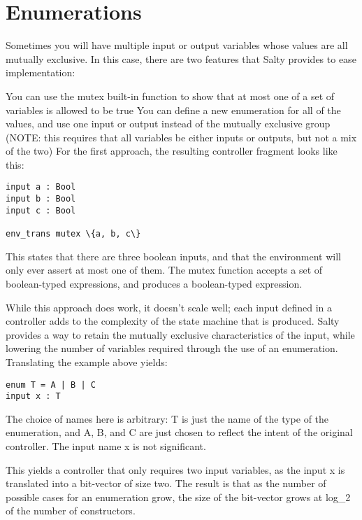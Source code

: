 \section{Enumerations}

Sometimes you will have multiple input or output variables whose values are all mutually exclusive. In this case, there are two features that Salty provides to ease implementation:

You can use the mutex built-in function to show that at most one of a set of variables is allowed to be true
You can define a new enumeration for all of the values, and use one input or output instead of the mutually exclusive group (NOTE: this requires that all variables be either inputs or outputs, but not a mix of the two)
For the first approach, the resulting controller fragment looks like this:
\begin{lstlisting}
input a : Bool
input b : Bool
input c : Bool

env_trans mutex \{a, b, c\}
\end{lstlisting}
This states that there are three boolean inputs, and that the environment will only ever assert at most one of them. The mutex function accepts a set of boolean-typed expressions, and produces a boolean-typed expression.

While this approach does work, it doesn't scale well; each input defined in a controller adds to the complexity of the state machine that is produced. Salty provides a way to retain the mutually exclusive characteristics of the input, while lowering the number of variables required through the use of an enumeration. Translating the example above yields:
\begin{lstlisting}
enum T = A | B | C
input x : T
\end{lstlisting}
The choice of names here is arbitrary: T is just the name of the type of the enumeration, and A, B, and C are just chosen to reflect the intent of the original controller. The input name x is not significant.

This yields a controller that only requires two input variables, as the input x is translated into a bit-vector of size two. The result is that as the number of possible cases for an enumeration grow, the size of the bit-vector grows at log\_2 of the number of constructors.

